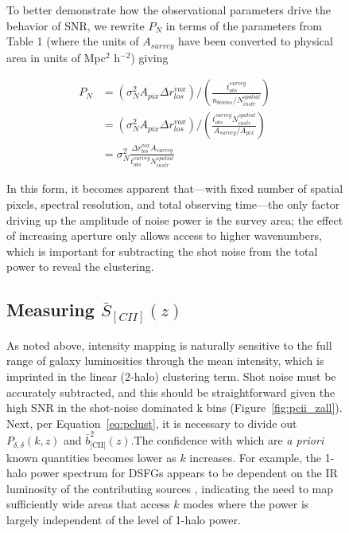 \documentclass[iop,twocolappendix]{emulateapj}
\begin{document}
\begin{figure}[t]
To better demonstrate how the observational parameters drive the behavior of SNR, we rewrite $P_N$ in terms of the parameters from Table 1 (where the units of $A_{survey}$ have been converted to physical area in units of Mpc$^{2}$ h$^{-2}$) giving 

\begin{equation}
\begin{split}
P_N& = \left(\sigma_N^2 A_{pix} \Delta r_{los}^{vox}\right) / \left({\frac{t_{obs}^{survey}}{n_{beams}/N_{instr}^{spatial}}}\right) \\
& = \left(\sigma_N^2 A_{pix}\Delta r_{los}^{vox}\right) /  \left(\frac{t_{obs}^{survey} N_{instr}^{spatial}}{A_{survey}/A_{pix}}\right)\\
& = \sigma_N^2 \frac{\Delta r_{los}^{vox} A_{survey}}{t_{obs}^{survey} N_{instr}^{spatial}}
\end{split}
\label{eq:pnoise}
\end{equation}

In this form, it becomes apparent that---with fixed number of spatial pixels, spectral resolution, and total observing time---the only factor driving up the amplitude of noise power is the survey area; the effect of increasing aperture only allows access to higher wavenumbers, which is important for subtracting the shot noise from the total power to reveal the clustering.

\subsection{Measuring $\bar{S}_{[CII]}(z)$}

As noted above, intensity mapping is naturally sensitive to the full range of galaxy luminosities through the mean intensity, which is imprinted in the linear (2-halo) clustering term. Shot noise must be accurately subtracted, and this should be straightforward given the high SNR in the shot-noise dominated k bins (Figure~\ref{fig:pcii_zall}).  Next, per Equation~\ref{eq:pclust}, it is necessary to divide out $P_{\delta,\delta}(k,z)$ and  $\bar{b}_{\textrm{[CII]}}^2(z)$.The confidence with which are \emph{a priori} known quantities becomes lower as $k$ increases. For example, the 1-halo power spectrum for DSFGs appears to be dependent on the IR luminosity of the contributing sources \citep{viero13}, indicating the need to map sufficiently wide areas that access $k$ modes where the power is largely independent of the level of 1-halo power. 


\end{figure}
\end{document}
